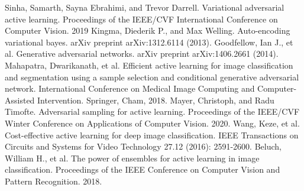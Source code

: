 \documentclass[runningheads]{llncs}
\begin{document}
\begin{thebibliography}{8}
    Sinha, Samarth, Sayna Ebrahimi, and Trevor Darrell. Variational adversarial active learning. Proceedings of the IEEE/CVF International Conference on Computer Vision. 2019
    Kingma, Diederik P., and Max Welling. Auto-encoding variational bayes. arXiv preprint arXiv:1312.6114 (2013).
    Goodfellow, Ian J., et al. Generative adversarial networks. arXiv preprint arXiv:1406.2661 (2014).
    Mahapatra, Dwarikanath, et al. Efficient active learning for image classification and segmentation using a sample selection and conditional generative adversarial network. International Conference on Medical Image Computing and Computer-Assisted Intervention. Springer, Cham, 2018.
    Mayer, Christoph, and Radu Timofte. Adversarial sampling for active learning. Proceedings of the IEEE/CVF Winter Conference on Applications of Computer Vision. 2020.
    Wang, Keze, et al. Cost-effective active learning for deep image classification. IEEE Transactions on Circuits and Systems for Video Technology 27.12 (2016): 2591-2600.
    Beluch, William H., et al. The power of ensembles for active learning in image classification. Proceedings of the IEEE Conference on Computer Vision and Pattern Recognition. 2018.
\end{thebibliography}
\end{document}
